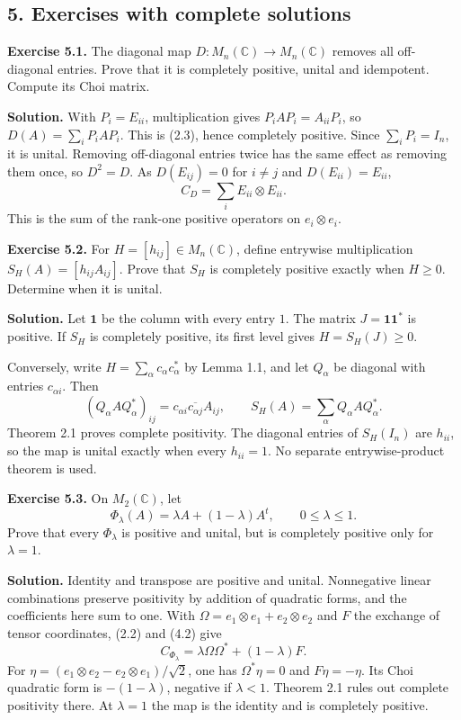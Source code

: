 \documentclass[
  11pt,
]{article}
\begin{document}
\subsection{5. Exercises with complete
solutions}\label{exercises-with-complete-solutions}

\textbf{Exercise 5.1.} The diagonal map
\(D:M_n(\mathbb C)\to M_n(\mathbb C)\) removes all off-diagonal entries.
Prove that it is completely positive, unital and idempotent. Compute its
Choi matrix.

\textbf{Solution.} With \(P_i=E_{ii}\), multiplication gives
\(P_iAP_i=A_{ii}P_i\), so \(D(A)=\sum_iP_iAP_i\). This is (2.3), hence
completely positive. Since \(\sum_iP_i=I_n\), it is unital. Removing
off-diagonal entries twice has the same effect as removing them once, so
\(D^2=D\). As \(D(E_{ij})=0\) for \(i\ne j\) and \(D(E_{ii})=E_{ii}\),
\[
C_D=\sum_iE_{ii}\otimes E_{ii}.
\] This is the sum of the rank-one positive operators on
\(e_i\otimes e_i\).

\textbf{Exercise 5.2.} For \(H=[h_{ij}]\in M_n(\mathbb C)\), define
entrywise multiplication \(S_H(A)=[h_{ij}A_{ij}]\). Prove that \(S_H\)
is completely positive exactly when \(H\geq0\). Determine when it is
unital.

\textbf{Solution.} Let \(\mathbf1\) be the column with every entry
\(1\). The matrix \(J=\mathbf1\mathbf1^*\) is positive. If \(S_H\) is
completely positive, its first level gives \(H=S_H(J)\geq0\).

Conversely, write \(H=\sum_\alpha c_\alpha c_\alpha^*\) by Lemma 1.1,
and let \(Q_\alpha\) be diagonal with entries \(c_{\alpha i}\). Then \[
(Q_\alpha A Q_\alpha^*)_{ij}
=c_{\alpha i}\overline{c_{\alpha j}}A_{ij},
\qquad
S_H(A)=\sum_\alpha Q_\alpha A Q_\alpha^*.
\] Theorem 2.1 proves complete positivity. The diagonal entries of
\(S_H(I_n)\) are \(h_{ii}\), so the map is unital exactly when every
\(h_{ii}=1\). No separate entrywise-product theorem is used.

\textbf{Exercise 5.3.} On \(M_2(\mathbb C)\), let \[
\Phi_\lambda(A)=\lambda A+(1-\lambda)A^t,
\qquad 0\leq\lambda\leq1.
\] Prove that every \(\Phi_\lambda\) is positive and unital, but is
completely positive only for \(\lambda=1\).

\textbf{Solution.} Identity and transpose are positive and unital.
Nonnegative linear combinations preserve positivity by addition of
quadratic forms, and the coefficients here sum to one. With
\(\Omega=e_1\otimes e_1+e_2\otimes e_2\) and \(F\) the exchange of
tensor coordinates, (2.2) and (4.2) give \[
C_{\Phi_\lambda}
=\lambda\Omega\Omega^*+(1-\lambda)F.
\] For \(\eta=(e_1\otimes e_2-e_2\otimes e_1)/\sqrt2\), one has
\(\Omega^*\eta=0\) and \(F\eta=-\eta\). Its Choi quadratic form is
\(-(1-\lambda)\), negative if \(\lambda<1\). Theorem 2.1 rules out
complete positivity there. At \(\lambda=1\) the map is the identity and
is completely positive.
\end{document}

